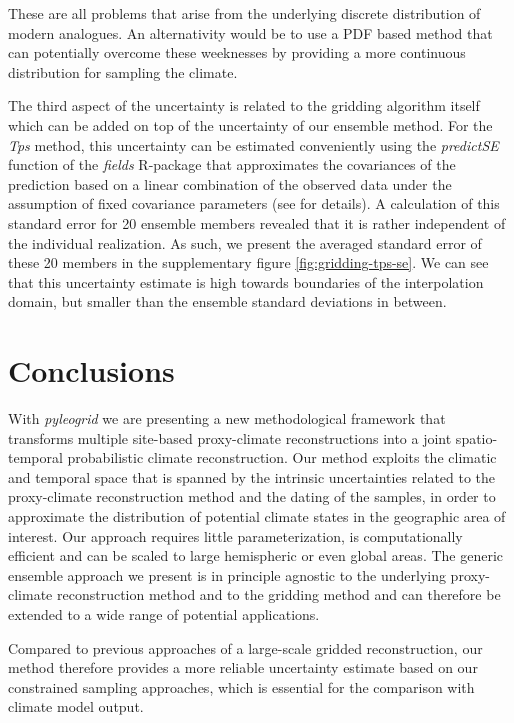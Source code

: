 \begin{refsection}
These are all problems that arise from the underlying discrete distribution of modern analogues. An alternativity would be to use a PDF based method \citep[for instance]{ChevalierCheddadiChase2014, Chevalier2019} that can potentially overcome these weeknesses by providing a more continuous distribution for sampling the climate.

The third aspect of the uncertainty is related to the gridding algorithm itself which can be added on top of the uncertainty of our ensemble method. For the \textit{Tps} method, this uncertainty can be estimated conveniently using the \textit{predictSE} function of the \textit{fields} R-package that approximates the covariances of the prediction based on a linear combination of the observed data under the assumption of fixed covariance parameters (see \cite{NychkaFurrerPaigeEtAl2017} for details). A calculation of this standard error for 20 ensemble members revealed that it is rather independent of the individual realization. As such, we present the averaged standard error of these 20 members in the supplementary figure \ref{fig:gridding-tps-se}. We can see that this uncertainty estimate is high towards boundaries of the interpolation domain, but smaller than the ensemble standard deviations in between.


\section{Conclusions}  \label{sec:gridding-conclusions}
With \textit{pyleogrid} we are presenting a new methodological framework that transforms multiple site-based proxy-climate reconstructions into a joint spatio-temporal probabilistic climate reconstruction. Our method exploits the climatic and temporal space that is spanned by the intrinsic uncertainties related to the proxy-climate reconstruction method and the dating of the samples, in order to approximate the distribution of potential climate states in the geographic area of interest. Our approach requires little parameterization, is computationally efficient and can be scaled to large hemispheric or even global areas. The generic ensemble approach we present is in principle agnostic to the underlying proxy-climate reconstruction method and to the gridding method and can therefore be extended to a wide range of potential applications.

Compared to previous approaches of a large-scale gridded reconstruction, our method therefore provides a more reliable uncertainty estimate based on our constrained sampling approaches, which is essential for the comparison with climate model output. 


\end{refsection}
